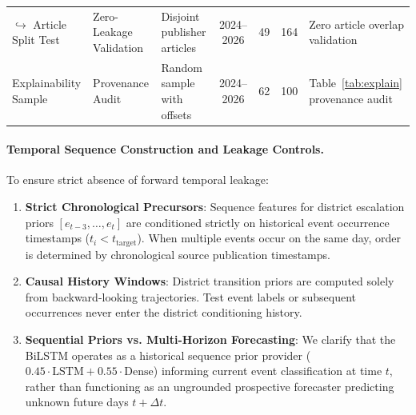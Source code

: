 \documentclass[11pt,a4paper]{article}
\begin{document}
\begin{table}[t]
\begin{tabular}{lp{3.6cm}p{3.2cm}cccp{3.5cm}}
\quad $\hookrightarrow$ Article Split Test & Zero-Leakage Validation  & Disjoint publisher articles  & 2024--2026           & 49                & 164             & Zero article overlap validation \\
Explainability Sample     & Provenance Audit         & Random sample with offsets   & 2024--2026           & 62                & 100             & Table~\ref{tab:explain} provenance audit \\
\bottomrule
\end{tabular}
\end{table}

\paragraph{Temporal Sequence Construction and Leakage Controls.}
To ensure strict absence of forward temporal leakage:
\begin{enumerate}
  \item \textbf{Strict Chronological Precursors}: Sequence features for district escalation priors $[e_{t-3}, \dots, e_t]$ are conditioned strictly on historical event occurrence timestamps ($t_i < t_{\text{target}}$). When multiple events occur on the same day, order is determined by chronological source publication timestamps.
  \item \textbf{Causal History Windows}: District transition priors are computed solely from backward-looking trajectories. Test event labels or subsequent occurrences never enter the district conditioning history.
  \item \textbf{Sequential Priors vs. Multi-Horizon Forecasting}: We clarify that the BiLSTM operates as a historical sequence prior provider ($0.45 \cdot \text{LSTM} + 0.55 \cdot \text{Dense}$) informing current event classification at time $t$, rather than functioning as an ungrounded prospective forecaster predicting unknown future days $t + \Delta t$.
\end{enumerate}
\end{document}
